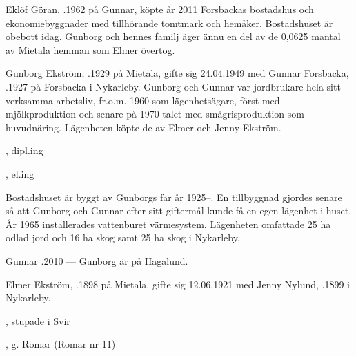 %



%
Eklöf Göran, .1962 på Gunnar, köpte år 2011 Forsbackas bostadshus och ekonomiebyggnader med tillhörande tomtmark och hemåker. Bostadshuset är obebott idag. Gunborg och hennes familj äger ännu en del av de 0,0625 mantal av Mietala hemman som Elmer övertog.


%
Gunborg Ekström, .1929 på Mietala, gifte sig 24.04.1949 med Gunnar Forsbacka, .1927 på Forsbacka i Nykarleby. Gunborg och Gunnar var jordbrukare hela sitt verksamma arbetsliv, fr.o.m. 1960 som lägenhetsägare, först med mjölkproduktion och senare på 1970-talet med smågrisproduktion som huvudnäring. Lägenheten köpte de av Elmer och Jenny Ekström.
\begin{jhchildren}
  \item {}, dipl.ing
  \item {}, el.ing
\end{jhchildren}

Bostadshuset är byggt av Gunborgs far år 1925--. En tillbyggnad gjordes senare så att Gunborg och Gunnar efter sitt
giftermål kunde få en egen lägenhet i huset. År 1965 installerades vattenburet värmesystem. Lägenheten omfattade 25 ha odlad jord och 16 ha skog samt 25 ha skog i Nykarleby.

Gunnar .2010  ---  Gunborg är på Hagalund.


%
Elmer Ekström, .1898 på Mietala, gifte sig 12.06.1921 med Jenny Nylund, .1899 i Nykarleby.
\begin{jhchildren}
  \item {}, stupade i Svir
  \item {}
  \item {}, g. Romar (Romar nr 11)
\end{jhchildren}

